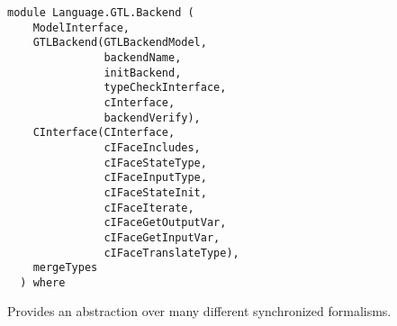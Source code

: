 \label{module:Language.GTL.Backend}
\haddockbeginheader
{\haddockverb\begin{verbatim}
module Language.GTL.Backend (
    ModelInterface, 
    GTLBackend(GTLBackendModel,
               backendName,
               initBackend,
               typeCheckInterface,
               cInterface,
               backendVerify), 
    CInterface(CInterface,
               cIFaceIncludes,
               cIFaceStateType,
               cIFaceInputType,
               cIFaceStateInit,
               cIFaceIterate,
               cIFaceGetOutputVar,
               cIFaceGetInputVar,
               cIFaceTranslateType), 
    mergeTypes
  ) where\end{verbatim}}
\haddockendheader

Provides an abstraction over many different synchronized formalisms.
\par

